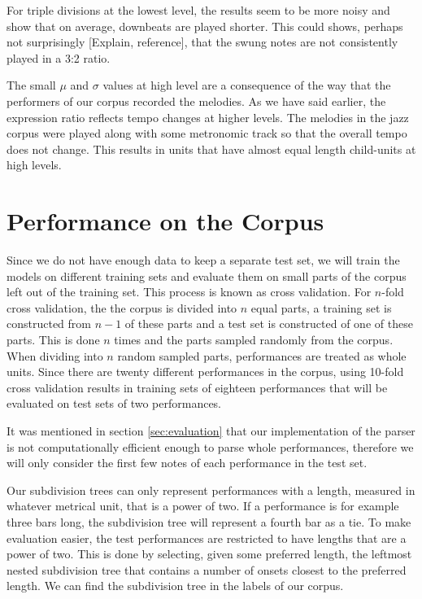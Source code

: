 For triple divisions at the lowest level, the results seem to be more noisy and show that on average, downbeats are played shorter. This could shows, perhaps not surprisingly [Explain, reference], that the swung notes are not consistently played in a 3:2 ratio.

The small $\mu$ and $\sigma$ values at high level are a consequence of the way that the performers of our corpus recorded the melodies. As we have said earlier, the expression ratio reflects tempo changes at higher levels. The melodies in the jazz corpus were played along with some metronomic track so that the overall tempo does not change. This results in units that have almost equal length child-units at high levels.

\section{Performance on the Corpus}

Since we do not have enough data to keep a separate test set, we will train the models on different training sets and evaluate them on small parts of the corpus left out of the training set. This process is known as cross validation. For $n$-fold cross validation, the the corpus is divided into $n$ equal parts, a training set is constructed from $n-1$ of these parts and a test set is constructed of one of these parts. This is done $n$ times and the parts sampled randomly from the corpus. When dividing into $n$ random sampled parts, performances are treated as whole units. Since there are twenty different performances in the corpus, using 10-fold cross validation results in training sets of eighteen performances that will be evaluated on test sets of two performances.

It was mentioned in section \ref{sec:evaluation} that our implementation of the parser is not computationally efficient enough to parse whole performances, therefore we will only consider the first few notes of each performance in the test set. 

Our subdivision trees can only represent performances with a length, measured in whatever metrical unit, that is a power of two. If a performance is for example three bars long, the subdivision tree will represent a fourth bar as a tie. To make evaluation easier, the test performances are restricted to have lengths that are a power of two. This is done by selecting, given some preferred length, the leftmost nested subdivision tree that contains a number of onsets closest to the preferred length. We can find the subdivision tree in the labels of our corpus.

